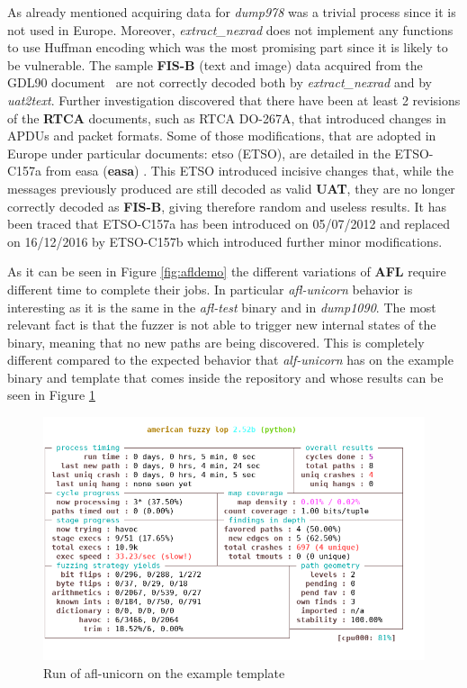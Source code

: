 \documentclass[../main.tex]{subfiles}
\begin{document}
As already mentioned acquiring data for \textit{dump978} was a trivial process since it is not used in Europe. Moreover, \textit{extract\_nexrad} does not implement any functions to use Huffman encoding which was the most promising part since it is likely to be vulnerable. The sample \textbf{FIS-B} (text and image) data acquired from the GDL90 document~\cite{gdl90} are not correctly decoded both by \textit{extract\_nexrad} and by \textit{uat2text}. Further investigation discovered that there have been at least 2 revisions of the \textbf{RTCA} documents, such as RTCA DO-267A, that introduced changes in APDUs and packet formats. Some of those modifications, that are adopted in Europe under particular documents: \acrlong{etso} (ETSO), are detailed in the ETSO-C157a from \acrlong{easa} (\textbf{\acrshort{easa}}) \cite{easa-all-etso}.
This ETSO introduced incisive changes that, while the messages previously produced are still decoded as valid \textbf{UAT}, they are no longer correctly decoded as \textbf{FIS-B}, giving therefore random and useless results.
It has been traced that ETSO-C157a has been introduced on 05/07/2012 and replaced on 16/12/2016 by ETSO-C157b which introduced further minor modifications.

\bigskip


As it can be seen in Figure \ref{fig:afldemo} the different variations of \textbf{AFL} require different time to complete their jobs. In particular \textit{afl-unicorn} behavior is interesting as it is the same in the \textit{afl-test} binary and in \textit{dump1090}. The most relevant fact is that the fuzzer is not able to trigger new internal states of the binary, meaning that no new paths are being discovered. This is completely different compared to the expected behavior that \textit{alf-unicorn} has on the example binary and template that comes inside the repository and whose results can be seen in Figure \ref{fig:aflunicornres}

\begin{figure}[htp]
  \centering
  \includegraphics[scale=0.75]{images/afl-unicorn-sample.png}
  \caption{Run of afl-unicorn on the example template}
  \label{fig:aflunicornres}
\end{figure}
\end{document}
